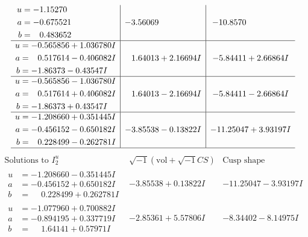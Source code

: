 \documentclass[1p]{elsarticle_modified}
\theoremstyle{definition}
\newcommand{\I}{\sqrt{-1}}
\begin{document}
$$\begin{array}{c|c|c}
\begin{aligned}
u &= -1.15270\phantom{ +0.000000I} \\
a &= -0.675521\phantom{ +0.000000I} \\
b &= \phantom{-}0.483652\phantom{ +0.000000I}\end{aligned}
 & -3.56069\phantom{ +0.000000I} & -10.8570\phantom{ +0.000000I} \\ \hline\begin{aligned}
u &= -0.565856 + 1.036780 I \\
a &= \phantom{-}0.517614 - 0.406082 I \\
b &= -1.86373 - 0.43547 I\end{aligned}
 & \phantom{-}1.64013 + 2.16694 I & -5.84411 + 2.66864 I \\ \hline\begin{aligned}
u &= -0.565856 - 1.036780 I \\
a &= \phantom{-}0.517614 + 0.406082 I \\
b &= -1.86373 + 0.43547 I\end{aligned}
 & \phantom{-}1.64013 - 2.16694 I & -5.84411 - 2.66864 I \\ \hline\begin{aligned}
u &= -1.208660 + 0.351445 I \\
a &= -0.456152 - 0.650182 I \\
b &= \phantom{-}0.228499 - 0.262781 I\end{aligned}
 & -3.85538 - 0.13822 I & -11.25047 + 3.93197 I\\
 \hline 
 \end{array}$$\newpage$$\begin{array}{c|c|c}  
\text{Solutions to }I^u_{2}& \I (\text{vol} + \sqrt{-1}CS) & \text{Cusp shape}\\
 \hline 
\begin{aligned}
u &= -1.208660 - 0.351445 I \\
a &= -0.456152 + 0.650182 I \\
b &= \phantom{-}0.228499 + 0.262781 I\end{aligned}
 & -3.85538 + 0.13822 I & -11.25047 - 3.93197 I \\ \hline\begin{aligned}
u &= -1.077960 + 0.700882 I \\
a &= -0.894195 + 0.337719 I \\
b &= \phantom{-}1.64141 + 0.57971 I\end{aligned}
 & -2.85361 + 5.57806 I & -8.34402 - 8.14975 I \\ \hline\begin{aligned}

\end{aligned}
\end{array}$$
\end{document}
